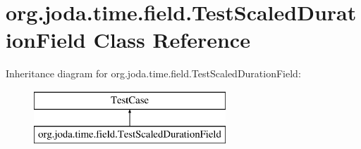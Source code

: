 \hypertarget{classorg_1_1joda_1_1time_1_1field_1_1_test_scaled_duration_field}{\section{org.\-joda.\-time.\-field.\-Test\-Scaled\-Duration\-Field Class Reference}
\label{classorg_1_1joda_1_1time_1_1field_1_1_test_scaled_duration_field}
}
Inheritance diagram for org.\-joda.\-time.\-field.\-Test\-Scaled\-Duration\-Field\-:\begin{figure}[H]
\begin{center}
\leavevmode
\includegraphics[height=2.000000cm]{classorg_1_1joda_1_1time_1_1field_1_1_test_scaled_duration_field}
\end{center}
\end{figure}
